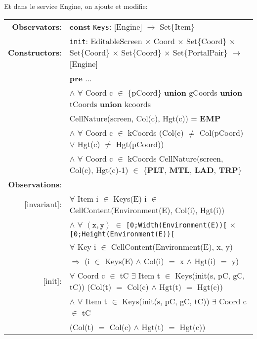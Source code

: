 \documentclass[8pt]{article}
\begin{document}
Et dans le service \textrm{Engine}, on ajoute et modifie:
{\small
  \begin{longtable}{rl}
    \textbf{Observators}: & \textbf{const} \texttt{Keys}: \textrm{[Engine]} $\rightarrow$ \textrm{Set\{Item\}} \\
    \textbf{Constructors}: &\texttt{init}: \textrm{EditableScreen} $\times$ \textrm{Coord} $\times$ \textrm{Set\{Coord\}} $\times$ \textrm{Set\{Coord\}} $\times$ \textrm{Set\{Coord\}} $\times$ \textrm{Set\{PortalPair\}} $\rightarrow$ \textrm{[Engine]} \\
    & \quad \textbf{pre} $\ldots$\\
    & \quad\quad\quad $\land$ $\forall$ \textrm{Coord} c $\in$ \{pCoord\} \textbf{union} gCoords \textbf{union} tCoords \textbf{union} kcoords\\
    & \quad\quad\quad\quad\quad \textrm{CellNature(screen, Col(c), Hgt(c))} = \textbf{EMP} \\
    & \quad\quad\quad $\land$ $\forall$ \textrm{Coord} c $\in$ kCoords (\textrm{Col(c)} $\neq$ \textrm{Col(pCoord)} $\lor$ \textrm{Hgt(c)} $\neq$ \textrm{Hgt(pCoord)})\\
    & \quad\quad\quad $\land$ $\forall$ \textrm{Coord} c $\in$ kCoords \textrm{CellNature(screen, Col(c), Hgt(c)-1)} $\in$ \{\textbf{PLT}, \textbf{MTL}, \textbf{LAD}, \textbf{TRP}\} \\
    \textbf{Observations}: &\\
    \textrm{[invariant]}: & $\forall$ \textrm{Item} i $\in$ \textrm{Keys(E)} i $\in$ \textrm{CellContent(Environment(E), Col(i), Hgt(i))}\\
    & \quad\quad $\land$ $\forall$ $(\mathtt{x},\mathtt{y})$ $\in$ \texttt{[0;Width(Environment(E))[} $\times$ \texttt{[0;Height(Environment(E))[}\\
    & \quad\quad\quad\quad $\forall$ \textrm{Key} i $\in$ \textrm{CellContent(Environment(E), x, y)} \\
    & \quad\quad\quad\quad\quad\quad $\Rightarrow$ (i $\in$ \textrm{Keys(E)} $\land$ \textrm{Col(i)} $=$ x $\land$ \textrm{Hgt(i)} $=$ y)\\
    \textrm{[init]}: & $\forall$ \textrm{Coord} c $\in$ tC $\exists$ \textrm{Item} t $\in$ \textrm{Keys(init(s, pC, gC, tC))} (\textrm{Col(t)} $=$ \textrm{Col(c)} $\land$ \textrm{Hgt(t)} $=$ \textrm{Hgt(c)})\\
  & \quad\quad $\land$ $\forall$ \textrm{Item} t $\in$ \textrm{Keys(init(s, pC, gC, tC))} $\exists$ \textrm{Coord} c $\in$ tC\\
  & \quad\quad\quad\quad (\textrm{Col(t)} $=$ \textrm{Col(c)} $\land$ \textrm{Hgt(t)} $=$ \textrm{Hgt(c)})\\

\end{longtable}}
\end{document}
